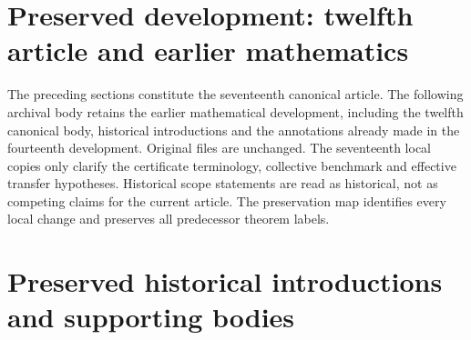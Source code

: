 \newif\ifcomplete\completetrue


\renewcommand{\thesection}{\arabic{section}}
\setcounter{section}{21}
\clearpage
\section*{Preserved development: twelfth article and earlier mathematics}
The preceding sections constitute the seventeenth canonical article.
The following archival body retains the earlier mathematical development,
including the twelfth canonical body, historical introductions and the
annotations already made in the fourteenth development. Original files
are unchanged. The seventeenth local copies only clarify the certificate
terminology, collective benchmark and effective transfer hypotheses.
Historical scope statements are read as historical, not as competing
claims for the current article. The preservation map identifies every
local change and preserves all predecessor theorem labels.

\clearpage
\section*{Preserved historical introductions and supporting bodies}



























